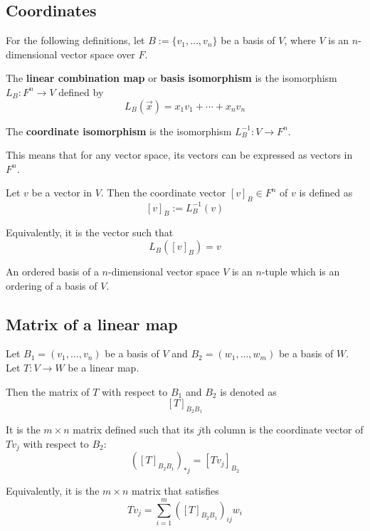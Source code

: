 \subsection{Coordinates}

For the following definitions, let $B := \{ v_1, \ldots, v_n \}$ be a basis of $V$, where $V$ is an $n$-dimensional vector space over $F$.

\begin{definition}
  The \textbf{linear combination map} or \textbf{basis isomorphism} is the isomorphism $L_B : F^n \to V$ defined by
  \[
    L_B(\vec{x}) = x_1 v_1 + \cdots + x_n v_n
  \]
\end{definition}

\begin{definition}
  The \textbf{coordinate isomorphism} is the isomorphism $L_B^{-1} : V \to 
  F^n$.

  This means that for any vector space, its vectors can be expressed as vectors in $F^n$.
\end{definition}

\begin{definition}
  Let $v$ be a vector in $V$. Then the coordinate vector $[v]_B \in F^n$ of $v$ is defined as 
  \[
    [v]_B := L_B^{-1}(v)
  \]

  Equivalently, it is the vector such that
  \[
    L_B([v]_B) = v
  \]
\end{definition}

\begin{definition}
  An ordered basis of a $n$-dimensional vector space $V$ is an $n$-tuple which is an ordering of a basis of $V$.
\end{definition}

\subsection{Matrix of a linear map}

\begin{definition}
  Let $B_1 = (v_1, \ldots, v_n)$ be a basis of $V$ and $B_2 = (w_1, \ldots, w_m)$ be a basis of $W$. Let $T : V \to W$ be a linear map.
  
  Then the matrix of $T$ with respect to $B_1$ and $B_2$ is denoted as
  \[
    [T]_{B_2 B_1}
  \]
  
  It is the $m \times n$ matrix defined such that its $j$th column is the coordinate vector of $T v_j$ with respect to $B_2$:
  \[
    \left([T]_{B_2 B_1}\right)_{*j} = [T v_j]_{B_2}
  \]

  Equivalently, it is the $m \times n$ matrix that satisfies
  \[
    T v_j = \sum_{i = 1}^m \left([T]_{B_2 B_1}\right)_{ij} w_i
  \]
\end{definition}

